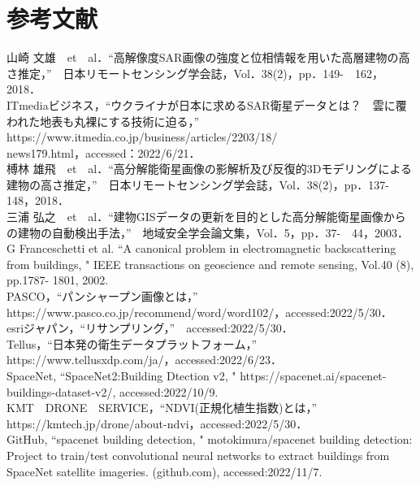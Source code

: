 \documentclass[a4j,twoside,twocolumn]{jarticle}
\begin{document}
\section{参考文献}
\relax[1]山崎 文雄　et　al．“高解像度SAR画像の強度と位相情報を用いた高層建物の高さ推定，”　日本リモートセンシング学会誌，Vol．38(2)，pp．149-　162，2018．\\
\relax[2]ITmediaビジネス，“ウクライナが日本に求めるSAR衛星データとは？　雲に覆われた地表も丸裸にする技術に迫る，”　https://www.itmedia.co.jp/business/articles/2203/18/\\news179.html，accessed：2022/6/21．\\
\relax[3]榑林 雄飛　et　al．“高分解能衛星画像の影解析及び反復的3Dモデリングによる建物の高さ推定，”　日本リモートセンシング学会誌，Vol．38(2)，pp．137-　148，2018．\\
\relax[4]三浦 弘之　et　al．“建物GISデータの更新を目的とした高分解能衛星画像からの建物の自動検出手法，”　地域安全学会論文集，Vol．5，pp．37-　44，2003．\\
\relax[5]G Franceschetti et al. ``A canonical problem in electromagnetic backscattering from buildings, " IEEE transactions on geoscience and remote sensing, Vol.40 (8), pp.1787- 1801, 2002.\\
\relax[6]PASCO，“パンシャープン画像とは，”　https://www.pasco.co.jp/recommend/word/word102/，accessed:2022/5/30．\\
\relax[7]esriジャパン，“リサンプリング，”　accessed:2022/5/30．\\
\relax[8]Tellus，“日本発の衛生データプラットフォーム，”　https://www.tellusxdp.com/ja/，accessed:2022/6/23．\\
\relax[9]SpaceNet, ``SpaceNet2:Building Dtection v2, " https://spacenet.ai/spacenet-buildings-dataset-v2/, accessed:2022/10/9.\\
\relax[10]KMT　DRONE　SERVICE，“NDVI(正規化植生指数)とは，”　https://kmtech.jp/drone/about-ndvi，accessed:2022/5/30．\\
\relax[11]GitHub, ``spacenet building detection, " motokimura/spacenet building detection: Project to train/test convolutional neural networks to extract buildings from SpaceNet satellite imageries. (github.com), accessed:2022/11/7.\\
\end{document}
